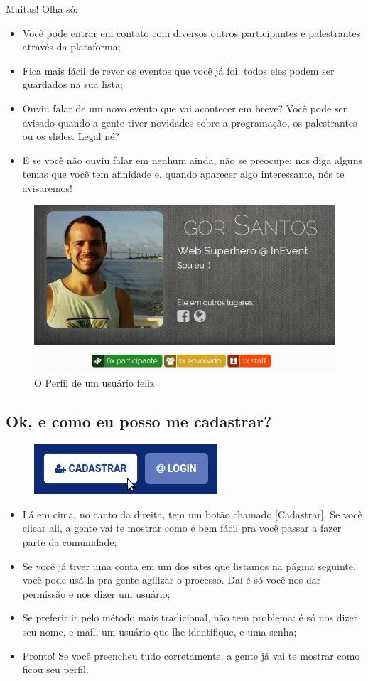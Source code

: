 \documentclass[12pt,a4paper,twoside,hyphens,english,brazil]{abntex2}
\begin{document}
{Muitas! Olha só:
\begin{itemize}[itemsep=-1ex]
	\item Você pode entrar em contato com diversos outros participantes e palestrantes através da plataforma;
	\item Fica mais fácil de rever os eventos que você já foi: todos eles podem ser guardados na sua lista;
	\item Ouviu falar de um novo evento que vai acontecer em breve? Você pode ser avisado quando a gente tiver novidades sobre a programação, os palestrantes ou os slides. Legal né?
	\item E se você não ouviu falar em nenhum ainda, não se preocupe: nos diga alguns temas que você tem afinidade e, quando aparecer algo interessante, nós te avisaremos!
\end{itemize}

\begin{figure}[h!]
	\centering \includegraphics[width=0.6\linewidth]{imagens/faq/perfil.jpg}
	\caption{O Perfil de um usuário feliz}
\end{figure}

\subsection{Ok, e como eu posso me cadastrar?} \label{faq:cadastrar}
\begin{figure}[h!]
	\vspace{-50pt}
	\includegraphics[width=0.3\linewidth,right]{imagens/faq/cadastrar.jpg}
	\vspace{-20pt}
\end{figure}
\begin{itemize}[itemsep=-0.8ex]
	\item Lá em cima, no canto da direita, tem um botão chamado [Cadastrar]. Se você clicar ali, a gente vai te mostrar como é bem fácil pra você passar a fazer parte da comunidade;
	\item Se você já tiver uma conta em um dos sites que listamos na página seguinte, você pode usá-la pra gente agilizar o processo. Daí é só você nos dar permissão e nos dizer um usuário;
	\item Se preferir ir pelo método mais tradicional, não tem problema: é só nos dizer seu nome, e-mail, um usuário que lhe identifique, e uma senha;
	\item Pronto! Se você preencheu tudo corretamente, a gente já vai te mostrar como ficou seu perfil.
\end{itemize}

}
\end{document}
